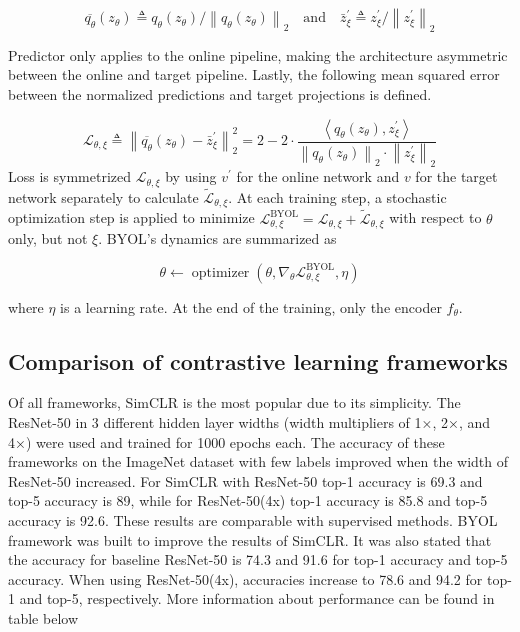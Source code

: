 \documentclass[
]{krantz}
\begin{document}
\begin{equation}
\tag{9}
\overline{q_{\theta}}\left(z_{\theta}\right) \triangleq q_{\theta}\left(z_{\theta}\right) /\left\|q_{\theta}\left(z_{\theta}\right)\right\|_{2} \quad \textrm{and} \quad
\bar{z}_{\xi}^{\prime} \triangleq z_{\xi}^{\prime} /\left\|z_{\xi}^{\prime}\right\|_{2}
\end{equation}

Predictor only applies to the online pipeline, making the architecture asymmetric between the online and target pipeline. Lastly, the following mean squared error between the normalized predictions and target projections is defined.

\begin{equation}
\tag{10}
\mathcal{L}_{\theta, \xi} \triangleq\left\|\overline{q_{\theta}}\left(z_{\theta}\right)-\bar{z}_{\xi}^{\prime}\right\|_{2}^{2}=2-2 \cdot \frac{\left\langle q_{\theta}\left(z_{\theta}\right), z_{\xi}^{\prime}\right\rangle}{\left\|q_{\theta}\left(z_{\theta}\right)\right\|_{2} \cdot\left\|z_{\xi}^{\prime}\right\|_{2}}
\end{equation}
Loss is symmetrized \(\mathcal{L}_{\theta, \xi}\) by using \(v^{\prime}\) for the online network and \(v\) for the target network separately to calculate \(\widetilde{\mathcal{L}}_{\theta, \xi}\). At each training step, a stochastic optimization step is applied to minimize \(\mathcal{L}_{\theta, \xi}^{\mathrm{BYOL}}=\mathcal{L}_{\theta, \xi}+\widetilde{\mathcal{L}}_{\theta, \xi}\) with respect to \(\theta\) only, but not \(\xi\). BYOL's dynamics are summarized as

\begin{equation}
\tag{11}
\theta \leftarrow \operatorname{optimizer}\left(\theta, \nabla_{\theta} \mathcal{L}_{\theta, \xi}^{\mathrm{BYOL}}, \eta\right)
\end{equation}

where \(\eta\) is a learning rate.
At the end of the training, only the encoder \(f_{\theta}\).

\hypertarget{comparison-of-contrastive-learning-frameworks}{%
\subsection{Comparison of contrastive learning frameworks}\label{comparison-of-contrastive-learning-frameworks}}

Of all frameworks, SimCLR is the most popular due to its simplicity. The ResNet-50 in 3 different hidden layer widths (width multipliers of 1×, 2×, and 4×) were used and trained for 1000 epochs each. The accuracy of these frameworks on the ImageNet dataset with few labels improved when the width of ResNet-50 increased. For SimCLR with ResNet-50 top-1 accuracy is 69.3 and top-5 accuracy is 89, while for ResNet-50(4x) top-1 accuracy is 85.8 and top-5 accuracy is 92.6. These results are comparable with supervised methods.
BYOL framework was built to improve the results of SimCLR. It was also stated that the accuracy for baseline ResNet-50 is 74.3 and 91.6 for top-1 accuracy and top-5 accuracy. When using ResNet-50(4x), accuracies increase to 78.6 and 94.2 for top-1 and top-5, respectively. More information about performance can be found in table below
\end{document}
